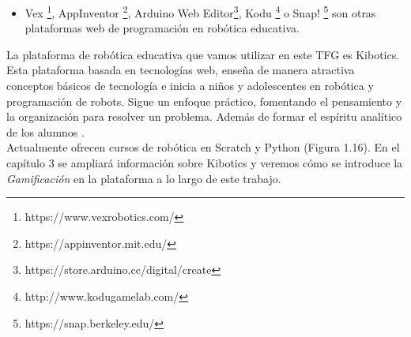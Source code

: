 \begin{itemize}
    \item Vex \footnote{https://www.vexrobotics.com/}, AppInventor \footnote{https://appinventor.mit.edu/}, Arduino Web Editor\footnote{https://store.arduino.cc/digital/create}, Kodu \footnote{http://www.kodugamelab.com/} o Snap! \footnote{https://snap.berkeley.edu/} son otras plataformas web de programación en robótica educativa.
\end{itemize}


La plataforma de robótica educativa que vamos utilizar en este TFG es Kibotics. Esta plataforma basada en tecnologías web, enseña de manera atractiva conceptos básicos de tecnología e inicia a niños y adolescentes en robótica y programación de robots. Sigue un enfoque práctico, fomentando el pensamiento y la organización para resolver un problema. Además de formar el espíritu analítico de los alumnos \cite{intro}.
\\
Actualmente ofrecen cursos de robótica en Scratch y Python (Figura 1.16). En el capítulo 3 se ampliará información sobre Kibotics y veremos cómo se introduce la \textit{Gamificación} en la plataforma a lo largo de este trabajo.


